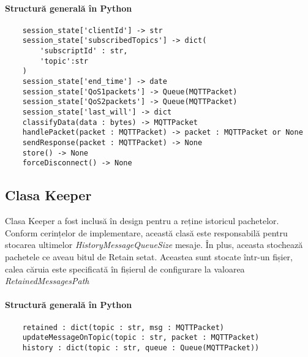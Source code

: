 \documentclass{report}
\begin{document}
\paragraph{Structură generală în Python}
\begin{verbatim}
	session_state['clientId'] -> str
	session_state['subscribedTopics'] -> dict(
		'subscriptId' : str, 
		'topic':str
	)
	session_state['end_time'] -> date
	session_state['QoS1packets'] -> Queue(MQTTPacket)
	session_state['QoS2packets'] -> Queue(MQTTPacket)
	session_state['last_will'] -> dict
	classifyData(data : bytes) -> MQTTPacket
	handlePacket(packet : MQTTPacket) -> packet : MQTTPacket or None
	sendResponse(packet : MQTTPacket) -> None
	store() -> None
	forceDisconnect() -> None
\end{verbatim}
\subsection{Clasa Keeper}
Clasa Keeper a fost inclusă în design pentru a reține istoricul pachetelor. Conform cerințelor de implementare, această clasă este responsabilă pentru stocarea ultimelor \emph{HistoryMessageQueueSize} mesaje. În plus, aceasta stochează pachetele ce aveau bitul de Retain setat. Aceastea sunt stocate într-un fișier, calea căruia este specificată în fișierul de configurare la valoarea \emph{RetainedMessagesPath}
\paragraph{Structură generală în Python}
\begin{verbatim}
	retained : dict(topic : str, msg : MQTTPacket)
	updateMessageOnTopic(topic : str, packet : MQTTPacket)
	history : dict(topic : str, queue : Queue(MQTTPacket))
\end{verbatim}
\end{document}
